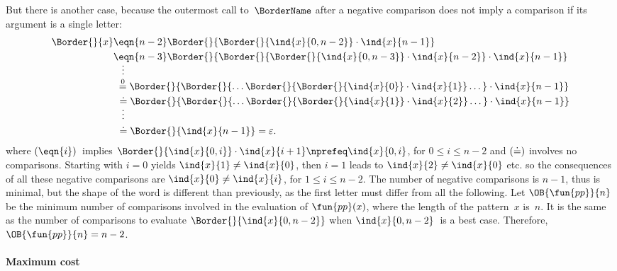 But there is another case,
because the outermost call to~\(\BorderName\) after a negative
comparison does not imply a comparison if its argument is a single
letter:
\begin{align*}
\Border{}{x}
&\eqn{n-2} \Border{}{\Border{}{\ind{x}{0,n-2}} \cdot \ind{x}{n-1}}\\
&\eqn{n-3} \Border{}{\Border{}{\Border{}{\ind{x}{0,n-3}} \cdot
    \ind{x}{n-2}} \cdot \ind{x}{n-1}}\\
&\;\;\;\smash{\vdots}\\
&\;\mathrel{\stackrel{\smash[t]{0}}{=}}
  \Border{}{\Border{}{\ldots \Border{}{\Border{}{\ind{x}{0}} \cdot
        \ind{x}{1}} \dots} \cdot \ind{x}{n-1}}\\
&\,\,\doteq
  \Border{}{\Border{}{\ldots \Border{}{\Border{}{\ind{x}{1}} \cdot
            \ind{x}{2}} \dots} \cdot \ind{x}{n-1}}\\
&\;\;\;\smash{\vdots}\\
&\,\,\doteq \Border{}{\ind{x}{n-1}} = \varepsilon.
\end{align*}
where \((\smash{\eqn{i}})\)~implies \(\Border{}{\ind{x}{0,i}} \cdot
\ind{x}{i+1} \nprefeq \ind{x}{0,i}\), for \(0 \leqslant i \leqslant
n-2\) and \((\smash{\doteq})\) involves no comparisons. Starting with
\(i=0\) yields \(\ind{x}{1} \neq \ind{x}{0}\), then \(i=1\) leads to
\(\ind{x}{2} \neq \ind{x}{0}\) etc. so the consequences of all these
negative comparisons are \(\ind{x}{0} \neq \ind{x}{i}\), for \(1
\leqslant i \leqslant n-2\). The number of negative comparisons is
\(n-1\), thus is minimal, but the shape of the word is different than
previously, as the first letter must differ from all the
following. Let \(\OB{\fun{pp}}{n}\) be
the minimum number of comparisons involved in the evaluation of
\(\fun{pp}(x)\), where the length of the
pattern~\(x\) is~\(n\). It is the same as the number of comparisons to
evaluate \(\Border{}{\ind{x}{0,n-2}}\) when \(\ind{x}{0,n-2}\)~is a
best case. Therefore,
\(\OB{\fun{pp}}{n} = n - 2\).

\paragraph{Maximum cost}

